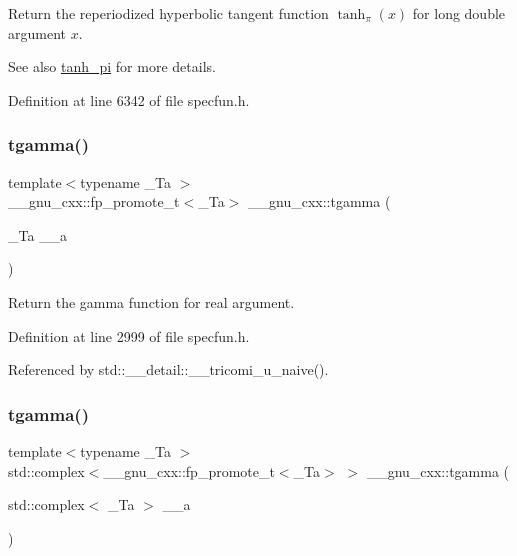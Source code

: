 Return the reperiodized hyperbolic tangent function $ \tanh_\pi(x) $ for {\ttfamily long double} argument $ x $.

\begin{DoxySeeAlso}{See also}
\hyperlink{group__gnu__math__spec__func_ga8729ffd5acf3266315e9dac1b5a9b3a6}{tanh\+\_\+pi} for more details. 
\end{DoxySeeAlso}


Definition at line 6342 of file specfun.\+h.

\mbox{\label{group__gnu__math__spec__func_ga73a634663e4eceb1e6bcf3fc16773b7b}} 
\subsubsection{\texorpdfstring{tgamma()}{tgamma()}\hspace{0.1cm}{\footnotesize\ttfamily [1/3]}}
{\footnotesize\ttfamily template$<$typename \+\_\+\+Ta $>$ \\
\+\_\+\+\_\+gnu\+\_\+cxx\+::fp\+\_\+promote\+\_\+t$<$\+\_\+\+Ta$>$ \+\_\+\+\_\+gnu\+\_\+cxx\+::tgamma (\begin{DoxyParamCaption}\item[{\+\_\+\+Ta}]{\+\_\+\+\_\+a }\end{DoxyParamCaption})\hspace{0.3cm}{\ttfamily [inline]}}

Return the gamma function for real argument. 

Definition at line 2999 of file specfun.\+h.



Referenced by std\+::\+\_\+\+\_\+detail\+::\+\_\+\+\_\+tricomi\+\_\+u\+\_\+naive().

\mbox{\label{group__gnu__math__spec__func_gab01fe5b7f1bacdafcad5746ef50af777}} 
\subsubsection{\texorpdfstring{tgamma()}{tgamma()}\hspace{0.1cm}{\footnotesize\ttfamily [2/3]}}
{\footnotesize\ttfamily template$<$typename \+\_\+\+Ta $>$ \\
std\+::complex$<$\+\_\+\+\_\+gnu\+\_\+cxx\+::fp\+\_\+promote\+\_\+t$<$\+\_\+\+Ta$>$ $>$ \+\_\+\+\_\+gnu\+\_\+cxx\+::tgamma (\begin{DoxyParamCaption}\item[{std\+::complex$<$ \+\_\+\+Ta $>$}]{\+\_\+\+\_\+a }\end{DoxyParamCaption})\hspace{0.3cm}{\ttfamily [inline]}}

